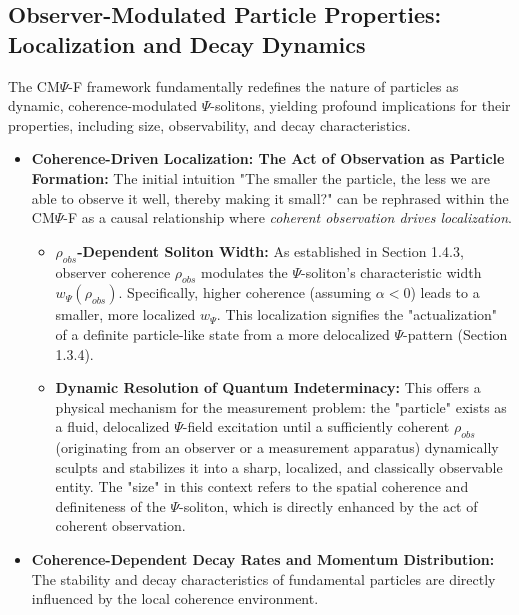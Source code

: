 \documentclass{report}
\begin{document}
\subsection{Observer-Modulated Particle Properties: Localization and Decay Dynamics}
\label{subsec:particle-properties}

The CM$\Psi$-F framework fundamentally redefines the nature of particles as dynamic, coherence-modulated $\Psi$-solitons, yielding profound implications for their properties, including size, observability, and decay characteristics.

\begin{itemize}
    \item \textbf{Coherence-Driven Localization: The Act of Observation as Particle Formation:}
    The initial intuition "The smaller the particle, the less we are able to observe it well, thereby making it small?" can be rephrased within the CM$\Psi$-F as a causal relationship where \emph{coherent observation drives localization}.
    \begin{itemize}
        \item \textbf{$\rho_{obs}$-Dependent Soliton Width:} As established in Section 1.4.3, observer coherence $\rho_{obs}$ modulates the $\Psi$-soliton's characteristic width $w_\Psi(\rho_{obs})$. Specifically, higher coherence (assuming $\alpha < 0$) leads to a smaller, more localized $w_\Psi$. This localization signifies the "actualization" of a definite particle-like state from a more delocalized $\Psi$-pattern (Section 1.3.4).
        \item \textbf{Dynamic Resolution of Quantum Indeterminacy:} This offers a physical mechanism for the measurement problem: the "particle" exists as a fluid, delocalized $\Psi$-field excitation until a sufficiently coherent $\rho_{obs}$ (originating from an observer or a measurement apparatus) dynamically sculpts and stabilizes it into a sharp, localized, and classically observable entity. The "size" in this context refers to the spatial coherence and definiteness of the $\Psi$-soliton, which is directly enhanced by the act of coherent observation.
    \end{itemize}
    \item \textbf{Coherence-Dependent Decay Rates and Momentum Distribution:}
    The stability and decay characteristics of fundamental particles are directly influenced by the local coherence environment.
    \begin{itemize}

\end{itemize}
\end{itemize}
\end{document}
